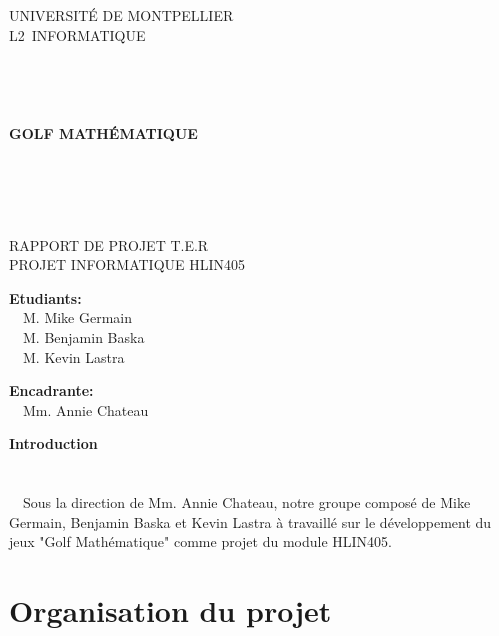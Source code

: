 \documentclass{article}
\begin{document}
\begin{center}
\linespread{2.0}\selectfont

{\Huge U}{\huge NIVERSITÉ DE }{\Huge M}{\huge ONTPELLIER}\\
{\huge L2}{\LARGE ~INFORMATIQUE }
\\~\\~\\~\\~\\
{\Large\textbf{GOLF MATHÉMATIQUE}}
\\~\\~\\~\\~\\

\linespread{1}\selectfont

RAPPORT DE PROJET T.E.R\\
PROJET INFORMATIQUE HLIN405\\
\vfill
\end{center}
\begin{multicols}{2}
\begin{flushleft}
\textbf{Etudiants:}\\
~~M. Mike Germain\\
~~M. Benjamin Baska\\
~~M. Kevin Lastra
\end{flushleft}
\columnbreak
\begin{flushright}
\textbf{Encadrante:}\\
~~Mm. Annie Chateau
\end{flushright}
\end{multicols}
\newpage
\setcounter{page}{1}
\tableofcontents
\newpage
{\textbf{\Huge Introduction}}\\~\\~\\
~~Sous la direction de Mm. Annie Chateau, notre groupe composé de Mike Germain, Benjamin Baska et Kevin Lastra à travaillé sur le développement du jeux "Golf Mathématique" comme projet du module HLIN405.

\newpage
\section{Organisation du projet}
\end{document}
